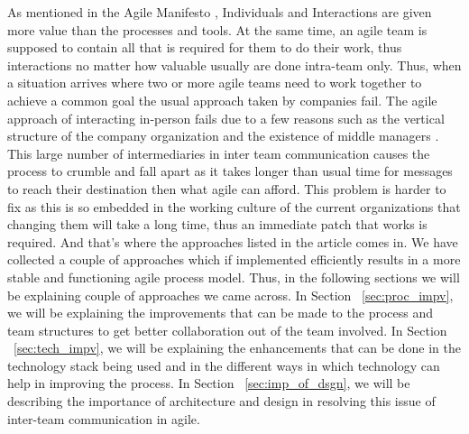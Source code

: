 As mentioned in the Agile Manifesto \cite{beck2001agile}, Individuals and Interactions are given more value than the processes and tools. At the same time, an agile team is supposed to contain all that is required for them to do their work, thus interactions no matter how valuable usually are done intra-team only. Thus, when a situation arrives where two or more agile teams need to work together to achieve a common goal the usual approach taken by companies fail. The agile approach of interacting in-person fails due to a few reasons such as the vertical structure of the company organization and the existence of middle managers \cite{dzone_article}. This large number of intermediaries in inter team communication causes the process to crumble and fall apart as it takes longer than usual time for messages to reach their destination then what agile can afford.
This problem is harder to fix as this is so embedded in the working culture of the current organizations that changing them will take a long time, thus an immediate patch that works is required. And that’s where the approaches listed in the article comes in. We have collected a couple of approaches which if implemented efficiently results in a more stable and functioning agile process model. Thus, in the following sections we will be explaining couple of approaches we came across.
\linebreak
\linebreak
In Section ~\ref{sec:proc_impv}, we will be explaining the improvements that can be made to the process and team structures to get better collaboration out of the team involved.
\linebreak
\linebreak
In Section ~\ref{sec:tech_impv}, we will be explaining the enhancements that can be done in the technology stack being used and in the different ways in which technology can help in improving the process.
\linebreak
\linebreak
In Section ~\ref{sec:imp_of_dsgn}, we will be describing the importance of architecture and design in resolving this issue of inter-team communication in agile.

